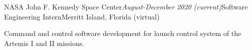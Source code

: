 \begin{rSubsection}{NASA John F. Kennedy Space Center}{\em August-December 2020 (current)}{Software Engineering Intern}{Merritt Island, Florida (virtual)}
\item Command and control software development for launch control system of the Artemis I and II missions.
\end{rSubsection}